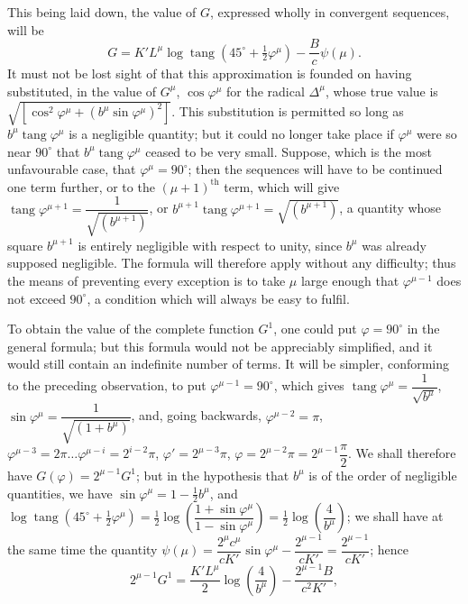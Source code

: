 \documentclass{article}
\begin{document}
This being laid down, the value of $G$, expressed wholly in convergent sequences, will be
\[ G=K'L^{\mu}\log\operatorname{tang}(45^{\circ}+\tfrac{1}{2}\varphi^{\mu})-\frac{B}{c}\psi(\mu). \]
It must not be lost sight of that this approximation is founded on having substituted, in the value of $G^{\mu}$, $\cos\varphi^{\mu}$ for the radical $\Delta^{\mu}$, whose true value is $\sqrt{[\cos^{2}\varphi^{\mu}+(b^{\mu}\sin\varphi^{\mu})^{2}]}$. This substitution is permitted so long as $b^{\mu}\operatorname{tang}\varphi^{\mu}$ is a negligible quantity; but it could no longer take place if $\varphi^{\mu}$ were so near $90^{\circ}$ that $b^{\mu}\operatorname{tang}\varphi^{\mu}$ ceased to be very small. Suppose, which is the most unfavourable case, that $\varphi^{\mu}=90^{\circ}$; then the sequences will have to be continued one term further, or to the $(\mu+1)^{\text{th}}$ term, which will give $\operatorname{tang}\varphi^{\mu+1}=\dfrac{1}{\sqrt{(b^{\mu+1})}}$, or $b^{\mu+1}\operatorname{tang}\varphi^{\mu+1}=\sqrt{(b^{\mu+1})}$, a quantity whose square $b^{\mu+1}$ is entirely negligible with respect to unity, since $b^{\mu}$ was already supposed negligible. The formula will therefore apply without any difficulty; thus the means of preventing every exception is to take $\mu$ large enough that $\varphi^{\mu-1}$ does not exceed $90^{\circ}$, a condition which will always be easy to fulfil.

To obtain the value of the complete function $G^{1}$, one could put $\varphi=90^{\circ}$ in the general formula; but this formula would not be appreciably simplified, and it would still contain an indefinite number of terms. It will be simpler, conforming to the preceding observation, to put $\varphi^{\mu-1}=90^{\circ}$, which gives $\operatorname{tang}\varphi^{\mu}=\dfrac{1}{\sqrt{b^{\mu}}}$, $\sin\varphi^{\mu}=\dfrac{1}{\sqrt{(1+b^{\mu})}}$, and, going backwards, $\varphi^{\mu-2}=\pi$, $\varphi^{\mu-3}=2\pi\ldots\varphi^{\mu-i}=2^{i-2}\pi$, $\varphi'=2^{\mu-3}\pi$, $\varphi=2^{\mu-2}\pi=2^{\mu-1}\dfrac{\pi}{2}$. We shall therefore have $G(\varphi)=2^{\mu-1}G^{1}$; but in the hypothesis that $b^{\mu}$ is of the order of negligible quantities, we have $\sin\varphi^{\mu}=1-\frac{1}{2}b^{\mu}$, and $\log\operatorname{tang}(45^{\circ}+\frac{1}{2}\varphi^{\mu})=\frac{1}{2}\log\left(\dfrac{1+\sin\varphi^{\mu}}{1-\sin\varphi^{\mu}}\right)=\frac{1}{2}\log\left(\dfrac{4}{b^{\mu}}\right)$; we shall have at the same time the quantity $\psi(\mu)=\dfrac{2^{\mu}c^{\mu}}{cK'}\sin\varphi^{\mu}-\dfrac{2^{\mu-1}}{cK'}=\dfrac{2^{\mu-1}}{cK'}$; hence
\[ 2^{\mu-1}G^{1}=\frac{K'L^{\mu}}{2}\log\left(\frac{4}{b^{\mu}}\right)-\frac{2^{\mu-1}B}{c^{2}K'}, \]
\end{document}
